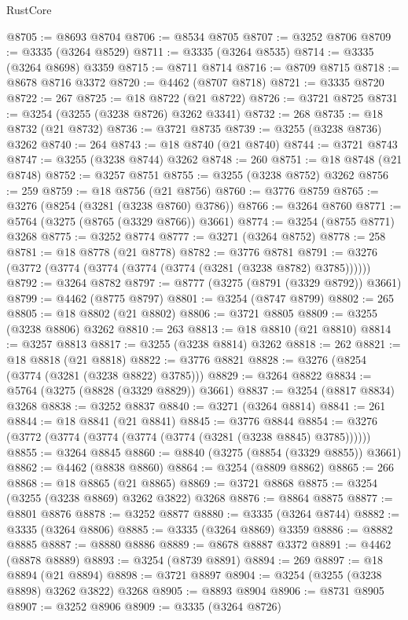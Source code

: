 \begin{lexlean}{RustCore}
\begin{coremodule}
@8705 := @8693 @8704
@8706 := @8534 @8705
@8707 := @3252 @8706
@8709 := @3335 (@3264 @8529)
@8711 := @3335 (@3264 @8535)
@8714 := @3335 (@3264 @8698) @3359
@8715 := @8711 @8714
@8716 := @8709 @8715
@8718 := @8678 @8716 @3372
@8720 := @4462 (@8707 @8718)
@8721 := @3335 @8720
@8722 := 267
@8725 := @18 @8722 (@21 @8722)
@8726 := @3721 @8725
@8731 := @3254 (@3255 (@3238 @8726) @3262 @3341)
@8732 := 268
@8735 := @18 @8732 (@21 @8732)
@8736 := @3721 @8735
@8739 := @3255 (@3238 @8736) @3262
@8740 := 264
@8743 := @18 @8740 (@21 @8740)
@8744 := @3721 @8743
@8747 := @3255 (@3238 @8744) @3262
@8748 := 260
@8751 := @18 @8748 (@21 @8748)
@8752 := @3257 @8751
@8755 := @3255 (@3238 @8752) @3262
@8756 := 259
@8759 := @18 @8756 (@21 @8756)
@8760 := @3776 @8759
@8765 := @3276 (@8254 (@3281 (@3238 @8760) @3786))
@8766 := @3264 @8760
@8771 := @5764 (@3275 (@8765 (@3329 @8766)) @3661)
@8774 := @3254 (@8755 @8771) @3268
@8775 := @3252 @8774
@8777 := @3271 (@3264 @8752)
@8778 := 258
@8781 := @18 @8778 (@21 @8778)
@8782 := @3776 @8781
@8791 := @3276 (@3772 (@3774 (@3774 (@3774 (@3774 (@3281 (@3238 @8782) @3785))))))
@8792 := @3264 @8782
@8797 := @8777 (@3275 (@8791 (@3329 @8792)) @3661)
@8799 := @4462 (@8775 @8797)
@8801 := @3254 (@8747 @8799)
@8802 := 265
@8805 := @18 @8802 (@21 @8802)
@8806 := @3721 @8805
@8809 := @3255 (@3238 @8806) @3262
@8810 := 263
@8813 := @18 @8810 (@21 @8810)
@8814 := @3257 @8813
@8817 := @3255 (@3238 @8814) @3262
@8818 := 262
@8821 := @18 @8818 (@21 @8818)
@8822 := @3776 @8821
@8828 := @3276 (@8254 (@3774 (@3281 (@3238 @8822) @3785)))
@8829 := @3264 @8822
@8834 := @5764 (@3275 (@8828 (@3329 @8829)) @3661)
@8837 := @3254 (@8817 @8834) @3268
@8838 := @3252 @8837
@8840 := @3271 (@3264 @8814)
@8841 := 261
@8844 := @18 @8841 (@21 @8841)
@8845 := @3776 @8844
@8854 := @3276 (@3772 (@3774 (@3774 (@3774 (@3774 (@3281 (@3238 @8845) @3785))))))
@8855 := @3264 @8845
@8860 := @8840 (@3275 (@8854 (@3329 @8855)) @3661)
@8862 := @4462 (@8838 @8860)
@8864 := @3254 (@8809 @8862)
@8865 := 266
@8868 := @18 @8865 (@21 @8865)
@8869 := @3721 @8868
@8875 := @3254 (@3255 (@3238 @8869) @3262 @3822) @3268
@8876 := @8864 @8875
@8877 := @8801 @8876
@8878 := @3252 @8877
@8880 := @3335 (@3264 @8744)
@8882 := @3335 (@3264 @8806)
@8885 := @3335 (@3264 @8869) @3359
@8886 := @8882 @8885
@8887 := @8880 @8886
@8889 := @8678 @8887 @3372
@8891 := @4462 (@8878 @8889)
@8893 := @3254 (@8739 @8891)
@8894 := 269
@8897 := @18 @8894 (@21 @8894)
@8898 := @3721 @8897
@8904 := @3254 (@3255 (@3238 @8898) @3262 @3822) @3268
@8905 := @8893 @8904
@8906 := @8731 @8905
@8907 := @3252 @8906
@8909 := @3335 (@3264 @8726)

\end{coremodule}
\end{lexlean}
